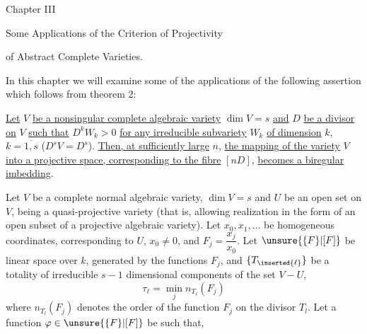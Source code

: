 
\begin{center}
Chapter III

Some Applications of the Criterion of Projectivity

of Abstract Complete Varieties.
\end{center}

In this chapter we will examine some of the applications of the following assertion which follows from theorem 2:

\uline{Let} $V$ \uline{be a nonsingular complete algebraic variety} $\dim V=s$ \uline{and} $D$ \uline{be a divisor on} $V$ \uline{such that} $D^kW_k>0$ \uline{for any irreducible subvariety} $W_k$ \uline{of dimension} $k$, $k=\overline{1,s}$ ($D^sV=D^s$). \uline{Then, at sufficiently large} $n$, \uline{the mapping of the variety} $V$ \uline{into a projective space, corresponding to the fibre} $[nD]$, \uline{becomes a biregular imbedding}.

Let $V$ be a complete normal algebraic variety, $\dim V=s$ and $U$ be an open set on $V$, being a quasi-projective variety (that is, allowing realization in the form of an open subset of a projective algebraic variety).
Let $x_0,x_1,\ldots$ be homogeneous coordinates, corresponding to $U$, $x_0\ne0$, and $F_j=\dfrac{x_j}{x_0}$. Let $\unsure{\{F\}|[F]}$ be  linear space over $k$, generated by the functions $F_j$, and $\{T_{\inserted{\ell}}\}$ be a totality of irreducible $s-1$ dimensional components of the set $V-U$,
\margin{$\ell$}
\[
\tau_\ell=\min_j n_{T_\ell}(F_j)
\]
where $n_{T_l}(F_j)$ denotes the order of the function $F_j$ on the divisor $T_l$. Let a function $\varphi\in\unsure{\{F\}|[F]}$ be such that,

